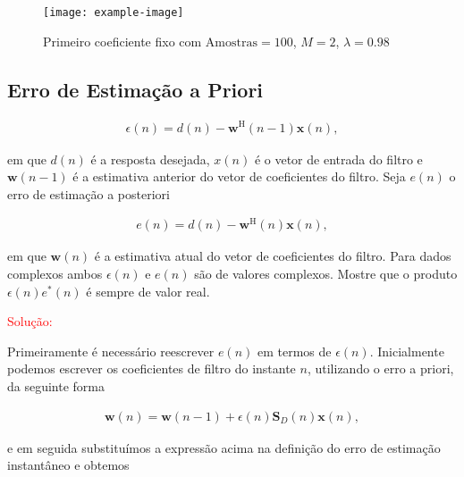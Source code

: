\begin{figure}[!htp]
    \centering
    \texttt{[image: example-image]}
    \caption{Primeiro coeficiente fixo com $\text{Amostras} = 100$, $M = 2$, $\lambda = 0.98$}
    \label{fig:L4Q2}
\end{figure}


\subsection{Erro de Estimação a Priori} %
    
\begin{align}
    \epsilon(n) = d(n) - \boldsymbol{w}^{\text{H}}(n - 1) \boldsymbol{x}(n),
\end{align}

em que $d(n)$ é a resposta desejada, $x(n)$ é o vetor de entrada do filtro e $\boldsymbol{w}(n - 1)$ é a estimativa
anterior do vetor de coeficientes do filtro. Seja $e(n)$ o erro de estimação a posteriori

\begin{align}
    e(n) = d(n) - \boldsymbol{w}^{\text{H}}(n) \boldsymbol{x}(n),
\end{align}

em que $\boldsymbol{w}(n)$ é a estimativa atual do vetor de coeficientes do filtro. Para dados complexos ambos
$\epsilon(n)$ e $e(n)$ são de valores complexos. Mostre que o produto $\epsilon(n)e^{*}(n)$ é sempre de valor real.

\textcolor{red}{Solução:}

Primeiramente é necessário reescrever $e(n)$ em termos de $\epsilon(n)$. Inicialmente podemos escrever os coeficientes de filtro do instante $n$,
utilizando o erro a priori, da seguinte forma

\begin{align}
    \boldsymbol{w}(n) = \boldsymbol{w}(n-1) + \epsilon(n) \boldsymbol{S}_{D}(n) \boldsymbol{x}(n),
\end{align}

e em seguida substituímos a expressão acima na definição do erro de estimação instantâneo e obtemos 

